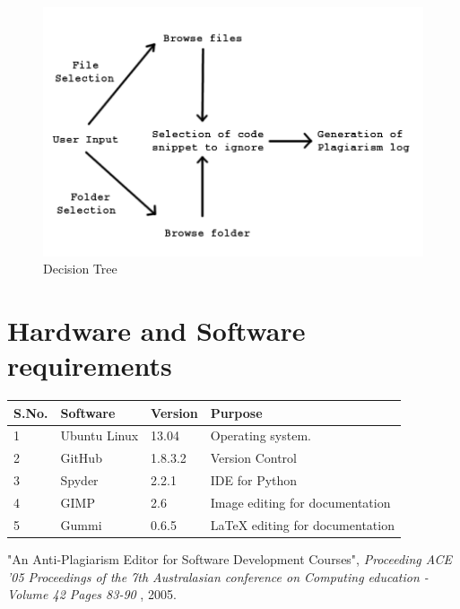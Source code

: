 \documentclass[11pt]{article}
\begin{document}
\begin{figure}[h!]

  \centering
    \includegraphics[width=1.2\textwidth]{DecisionTree}
      \caption{Decision Tree}
\end{figure}


\section{Hardware and Software requirements}

\begin{center}
    \begin{tabular}{ | l | l | l | p{6cm} |}
    \hline
    \textbf{S.No.} & \textbf{Software} & \textbf{Version} & \textbf{Purpose}\\ \hline
    1 & Ubuntu Linux & 13.04 & Operating system. \\ \hline
    2 & GitHub & 1.8.3.2 &Version Control \\ \hline
    3 & Spyder & 2.2.1 & IDE for Python \\ \hline
    4 & GIMP & 2.6 & Image editing for documentation \\ \hline
    5 & Gummi & 0.6.5 & LaTeX editing for documentation \\ \hline    

    \end{tabular}
\end{center}


\begin{thebibliography}{1}

"An Anti-Plagiarism Editor for Software Development Courses", \emph{Proceeding
ACE '05 Proceedings of the 7th Australasian conference on Computing education - Volume 42
Pages 83-90 }, 2005.

\end{thebibliography}
\end{document}
